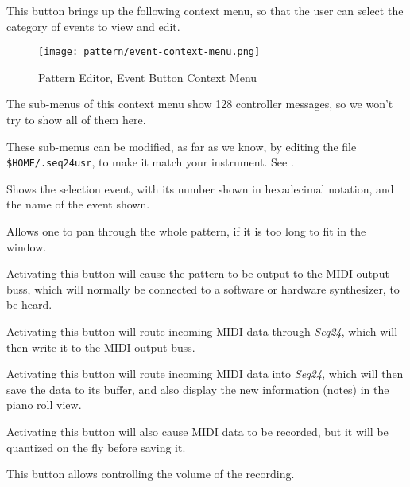    \setcounter{ItemCounter}{0}      %

   This button brings up the following context menu, so that the user can
   select the category of events to view and edit.

\begin{figure}[H]
   \centering 
   \texttt{[image: pattern/event-context-menu.png]}
   \caption{Pattern Editor, Event Button Context Menu}
   \label{fig:pattern_editor_bottom_event_context_menu}
\end{figure}

   The sub-menus of this context menu show 128 controller messages,
   so we won't try to show all of them here.

   These sub-menus can be modified, as far as we know, by editing
   the file \texttt{\$HOME/.seq24usr}, to make it match your instrument.
   See .

   Shows the selection event, with its number shown in hexadecimal notation,
   and the name of the event shown.

   Allows one to pan through the whole pattern, if it is too long to fit in
   the window.

   Activating this button will cause the pattern to be output to the MIDI
   output buss, which will normally be connected to a software or hardware
   synthesizer, to be heard.

   Activating this button will route incoming MIDI data through
   \textsl{Seq24}, which will then write it to the MIDI output buss.

   Activating this button will route incoming MIDI data into
   \textsl{Seq24}, which will then save the data to its buffer, and also
   display the new information (notes) in the piano roll view.

   Activating this button will also cause MIDI data to be recorded, but it
   will be quantized on the fly before saving it.

   This button allows controlling the volume of the recording.

